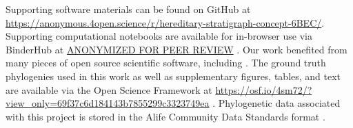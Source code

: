 Supporting software materials can be found on GitHub at \url{https://anonymous.4open.science/r/hereditary-stratigraph-concept-6BEC/}.%
Supporting computational notebooks are available for in-browser use via BinderHub at \url{ANONYMIZED FOR PEER REVIEW} \citep{ragan2018binder}. %
Our work benefited from many pieces of open source scientific software, including \citep{sukumaran2010dendropy,virtanen2020scipy,hunter2007matplotlib,virtanen2020scipy,waskom2021seaborn,bostock2011d3,meurer2017sympy,smith2020treedistdata,paradis2004ape,ushey2022reticulate,wickham2022dplyr}.
The ground truth phylogenies used in this work as well as supplementary figures, tables, and text are available via the Open Science Framework at
\url{https://osf.io/4sm72/?view_only=69f37c6d184143b7855299c3323749ea} \citep{moreno2022hstratconceptsupplement} \citep{foster2017open}.
Phylogenetic data associated with this project is stored in the Alife Community Data Standards format \citep{lalejini2019data}.
